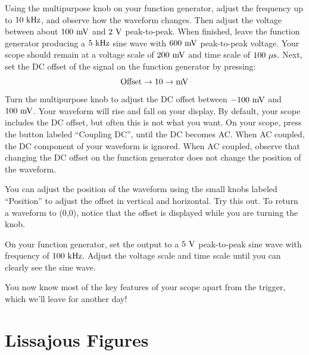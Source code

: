 Using the multipurpose knob on your function generator, adjust the
frequency up to $10~\rm kHz$, and observe how the waveform changes.
Then adjust the voltage between about $100~\rm mV$ and $2~\rm V$
peak-to-peak.  When finished, leave the function generator producing a
$5~\rm kHz$ sine wave with $600~\rm mV$ peak-to-peak voltage.  Your
scope should remain at a voltage scale of $200~\rm mV$ and time scale
of $100~\rm \mu s$.  Next, set the DC offset of the signal on the function generator by pressing:
\begin{displaymath}
{\rm Offset \to 10 \to mV}
\end{displaymath}
Turn the multipurpose knob to adjust the DC offset between $-100~\rm
mV$ and $100~\rm mV$.  Your waveform will rise and fall on your
display.  By default, your scope includes the DC offset, but often this
is not what you want.  On your scope, press the button labeled
``Coupling DC'', until the DC becomes AC.  When AC coupled, the DC
component of your waveform is ignored.  When AC coupled, observe that
changing the DC offset on the function generator does not change the
position of the waveform.

You can adjust the position of the waveform using the small knobs
labeled ``Position'' to adjust the offset in vertical and horizontal.
Try this out.  To return a waveform to (0,0), notice that the offset
is displayed while you are turning the knob.

On your function generator, set the output to a $5~\rm V$ peak-to-peak
sine wave with frequency of $100~\rm kHz$.  Adjust the voltage scale
and time scale until you can clearly see the sine wave.

You now know most of the key features of your scope apart from the
trigger, which we'll leave for another day!

\section{Lissajous Figures}


